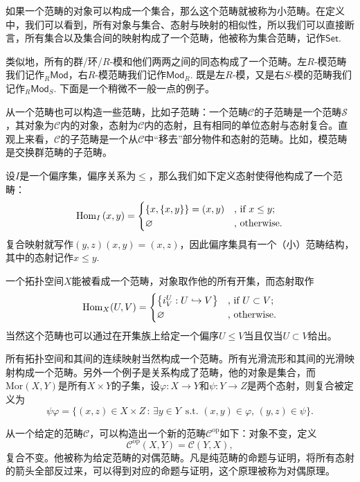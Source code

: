 如果一个范畴的对象可以构成一个集合，那么这个范畴就被称为小范畴。在定义中，我们可以看到，所有对象与集合、态射与映射的相似性，所以我们可以直接断言，所有集合以及集合间的映射构成了一个范畴，他被称为集合范畴，记作$\mathsf{Set}$.

类似地，所有的群/环/$R$-模和他们两两之间的同态构成了一个范畴。左$R$-模范畴我们记作${}_R\mathsf{Mod}$，右$R$-模范畴我们记作$\mathsf{Mod}_R$. 既是左$R$-模，又是右$S$-模的范畴我们记作${}_R\mathsf{Mod}_S$. 下面是一个稍微不一般一点的例子。

从一个范畴也可以构造一些范畴，比如子范畴：一个范畴$\mathcal{C}$的子范畴是一个范畴$\mathcal{S}$，其对象为$\mathcal{C}$内的对象，态射为$\mathcal{C}$内的态射，且有相同的单位态射与态射复合。直观上来看，$\mathcal{C}$的子范畴是一个从$\mathcal{C}$中“移去”部分物件和态射的范畴。比如，模范畴是交换群范畴的子范畴。

\para[作为范畴的偏序集] 设$I$是一个偏序集，偏序关系为$\leq$，那么我们如下定义态射使得他构成了一个范畴：
\[
	\operatorname{Hom}_{I}\left(x,y\right)=\begin{cases}
	\{x,\{x,y\}\}=(x,y)&\text{, if }x\leq y\text{;}\\
	\varnothing&\text{, otherwise}.
	\end{cases}
\]
复合映射就写作$(y,z)(x,y)=(x,z)$，因此偏序集具有一个（小）范畴结构，其中的态射记作$x\leq y$.

一个拓扑空间$X$能被看成一个范畴，对象取作他的所有开集，而态射取作
\[
	\operatorname{Hom}_{X}(U,V)=\begin{cases}
	\bigl\{i^U_V:U\hookrightarrow V\bigr\}&\text{, if }U\subset V\text{;}\\
	\varnothing&\text{, otherwise}.
	\end{cases}
\]
当然这个范畴也可以通过在开集族上给定一个偏序$U\leq V$当且仅当$U\subset V$给出。

所有拓扑空间和其间的连续映射当然构成一个范畴。所有光滑流形和其间的光滑映射构成一个范畴。另外一个例子是关系构成了范畴，他的对象是集合，而$\text{Mor}(X,Y)$是所有$X\times Y$的子集，设$\varphi:X\to Y$和$\psi:Y\to Z$是两个态射，则复合被定义为
\[
	\psi\varphi=\bigl\{(x,z)\in X\times Z\,:\,\exists y\in Y\,\text{ s.t. } (x,y)\in\varphi,\, (y,z)\in \psi\bigr\}.
\]

\para[对偶范畴] 从一个给定的范畴$\mathcal{C}$，可以构造出一个新的范畴$\mathcal{C}^{\mathrm{op}}$如下：对象不变，定义
\[\mathcal{C}^{\mathrm{op}}(X,Y)=\mathcal{C}(Y,X),\]复合不变。他被称为给定范畴的对偶范畴。凡是纯范畴的命题与证明，将所有态射的箭头全部反过来，可以得到对应的命题与证明，这个原理被称为对偶原理。\endpara

